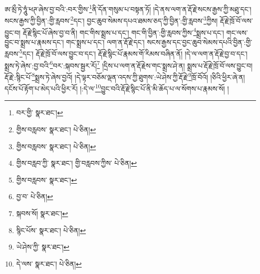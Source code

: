 ཨ་མྲྀ་ཏེ་ཧཱུཾ་ཕཊ་ཞེས་བྱ་བའི་:བར་གྱིས་\footnote{བར་གྱི་  སྣར་ཐང་། }ནི་དོན་གསུམ་པ་བསྟན་ཏོ། །དེ་ནས་ལག་ན་རྡོ་རྗེ་སངས་རྒྱས་ཀྱི་མཐུ་དང་། སངས་རྒྱས་ཀྱི་བྱིན་:གྱི་རླབས་\footnote{གྱིས་བརླབས་  སྣར་ཐང་།  པེ་ཅིན། }དང་། བྱང་ཆུབ་སེམས་དཔའ་ཐམས་ཅད་ཀྱི་བྱིན་:གྱི་རླབས་\footnote{གྱིས་བརླབས་  སྣར་ཐང་།  པེ་ཅིན། }ཀྱིས། རྡོ་རྗེ་ཁྲོ་བོ་ལས་བྱུང་བ། རྡོ་རྗེ་སྙིང་པོ་ཞེས་བྱ་བ་ནི། གང་གིས་སྨྲས་པ་དང་། གང་གི་བྱིན་:གྱི་རླབས་ཀྱིས་\footnote{གྱིས་བརླབ་ཀྱི་  སྣར་ཐང་། གྱི་བརླབས་ཀྱིས་  པེ་ཅིན། }སྨྲས་པ་དང་། གང་ལས་བྱུང་བ་སྨྲས་པ་རྣམས་དང་། གང་སྨྲས་པ་དང་། ལག་ན་རྡོ་རྗེ་དང་། སངས་རྒྱས་དང་བྱང་ཆུབ་སེམས་དཔའི་བྱིན་:གྱི་རླབས་\footnote{གྱིས་བརླབས་  སྣར་ཐང་། }དང་། རྡོ་རྗེ་ཁྲོ་བོ་ལས་བྱུང་བ་དང་། རྡོ་རྗེ་སྙིང་པོ་རྣམས་གོ་རིམས་བཞིན་ནོ། །དེ་ལ་ལག་ན་རྡོ་རྗེ་བྱ་བ་དང་། སྨྲས་ཏེ་ཞེས་:བྱ་བའི་\footnote{བྱ་བ་  པེ་ཅིན། }བར་:སྐབས་སྦྱར་རོ།\footnote{སྐབས་སོ།  སྣར་ཐང་། } །དྲིས་པ་ལག་ན་རྡོ་རྗེས་གང་སྨྲས་ཤེ་ན། སྨྲས་པ་རྡོ་རྗེ་ཁྲོ་བོ་ལས་བྱུང་བ། རྡོ་རྗེ་:སྙིང་པོ་\footnote{སྙིང་པོས་  སྣར་ཐང་།  པེ་ཅིན། }སྨྲས་ཏེ་ཞེས་བྱའོ། །དེ་ལྟར་བཅོམ་ལྡན་འདས་ཀྱི་ཐུགས་:ཡེ་ཤེས་ཀྱི་རྡོ་རྗེ་\footnote{ཡེ་ཤེས་ཀྱི་  སྣར་ཐང་། }ཁྲོ་བོའོ། །ཅིའི་ཕྱིར་ཞེ་ན། དངོས་པོ་རྟོག་པ་མེད་པའི་ཕྱིར་རོ། །:དེ་ལ་\footnote{དེ་ལས་  སྣར་ཐང་།  པེ་ཅིན། }བྱུང་བའི་རྡོ་རྗེ་སྙིང་པོ་ནི་མི་ཆོད་པ་ལ་སོགས་པ་རྣམས་སོ། །
